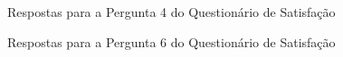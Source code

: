 \begin{figure}[ht!]
\begin{center}
	\end{center}
	\caption{Respostas para a Pergunta 4 do Questionário de Satisfação}
	\label{estudodecaso:resultados:respostasAuxilio}
\end{figure}

\begin{figure}[ht!]
\begin{center}
	\end{center}
	\caption{Respostas para a Pergunta 6 do Questionário de Satisfação}
	\label{estudodecaso:resultados:respostasUtilizacao}
\end{figure}
